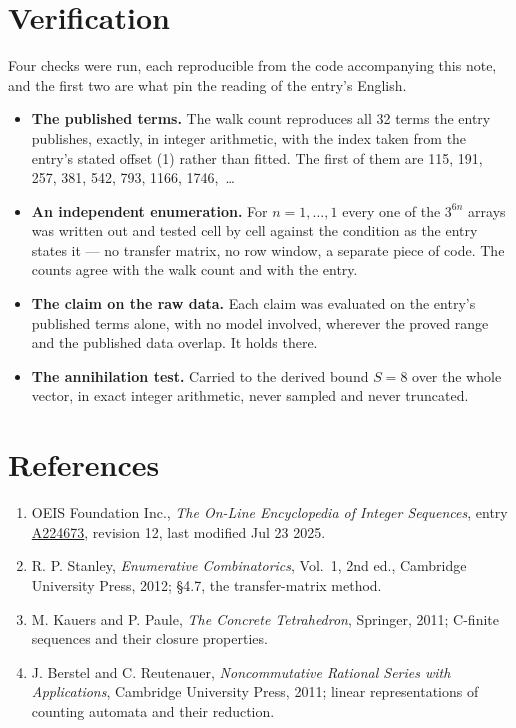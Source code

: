 \documentclass[11pt]{article}
\theoremstyle{definition}
\begin{document}
\section{Verification}

Four checks were run, each reproducible from the code accompanying this note, and the first two are what pin the reading of the entry's English.

\begin{itemize}

\item {\bfseries The published terms.} The walk count reproduces all 32 terms the entry publishes, exactly, in integer arithmetic, with the index taken from the entry's stated offset (1) rather than fitted. The first of them are 115, 191, 257, 381, 542, 793, 1166, 1746,~\dots

\item {\bfseries An independent enumeration.} For $n = 1,\dots,1$ every one of the $3^{6n}$ arrays was written out and tested cell by cell against the condition as the entry states it --- no transfer matrix, no row window, a separate piece of code. The counts agree with the walk count and with the entry.

\item {\bfseries The claim on the raw data.} Each claim was evaluated on the entry's published terms alone, with no model involved, wherever the proved range and the published data overlap. It holds there.

\item {\bfseries The annihilation test.} Carried to the derived bound $S = 8$ over the whole vector, in exact integer arithmetic, never sampled and never truncated.

\end{itemize}

\section{References}

\begin{enumerate}

\item OEIS Foundation Inc., \emph{The On-Line Encyclopedia of Integer Sequences}, entry \href{https://oeis.org/A224673}{A224673}, revision 12, last modified Jul 23 2025.

\item R. P. Stanley, \emph{Enumerative Combinatorics}, Vol.~1, 2nd ed., Cambridge University Press, 2012; \S4.7, the transfer-matrix method.

\item M. Kauers and P. Paule, \emph{The Concrete Tetrahedron}, Springer, 2011; C-finite sequences and their closure properties.

\item J. Berstel and C. Reutenauer, \emph{Noncommutative Rational Series with Applications}, Cambridge University Press, 2011; linear representations of counting automata and their reduction.

\end{enumerate}
\end{document}
